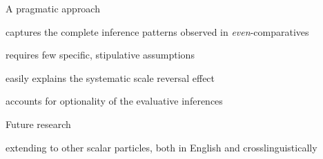 \documentclass[11pt,letterpaper]{scrartcl}
\newcommand{\cmark}{\ding{51}} %
\newcommand{\done}{\rlap{$\square$}{\raisebox{2pt}{\large\hspace{1pt}\cmark}}%
	\hspace{-2.5pt}}
\begin{document}
\vspace{0.25cm}
    \begin{tcolorbox}[colback=yellow!5!white,colframe=yellow!75!black,title=Summary]
    
    A pragmatic approach
    
    \vspace{2pt}
    
    \begin{todolist}[itemsep=2pt]
        \item[\done] captures the complete inference patterns observed in \textit{even}-comparatives
        \item[\done] requires few specific, stipulative assumptions
        \item[\done] easily explains the systematic scale reversal effect
        \item[\done] accounts for optionality of the evaluative inferences
    \end{todolist}
    
    \tcblower
    
    Future research
    \begin{todolist}
        \item extending to other scalar particles, both in English and crosslinguistically
    \end{todolist}

    \end{tcolorbox}












\newpage
\printbibliography
\end{document}
